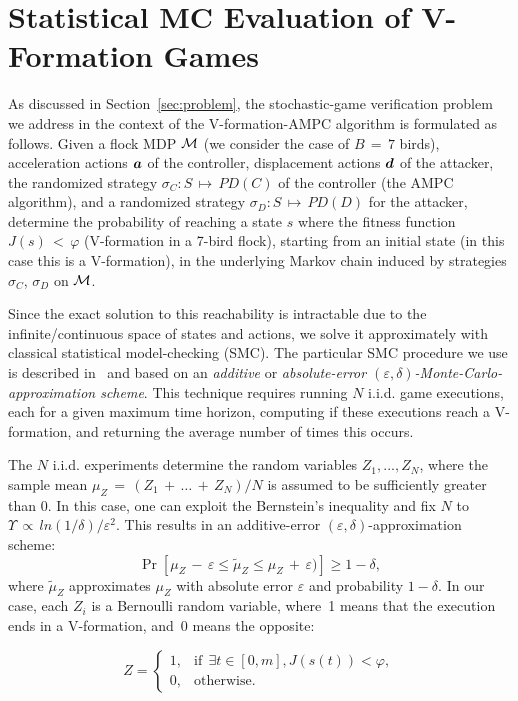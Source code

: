 \section{Statistical MC Evaluation of V-Formation Games}
\label{sec:results}
\newcommand{\majExp}{{2,000}}

As discussed in Section~\ref{sec:problem}, the
stochastic-game verification problem we address in the context of the V-formation-AMPC algorithm is formulated as follows.  Given a flock MDP ${\mathcal{M}}$ (we consider the case of $B\,{=}\,7$ birds), acceleration actions ${\boldsymbol {a}}$ of the controller, displacement actions ${\boldsymbol {d}}$ of the attacker, the randomized strategy $\sigma_C: S\,{\mapsto}\,PD(C)$ of the controller (the AMPC algorithm), and a randomized strategy
$\sigma_D: S\,{\mapsto}\,PD(D)$ for the attacker,
determine the probability of reaching a state $s$ where the fitness function $J(s)\,{<}\,\varphi$ (V-formation in a 7-bird flock), starting from an initial state (in this case this is a V-formation), in the underlying Markov chain induced by strategies $\sigma_C$, $\sigma_D$ on ${\mathcal{M}}$.

Since the exact solution to this reachability is intractable due to the infinite/continuous space of states and actions, we solve it approximately with classical statistical model-checking (SMC).  The particular SMC procedure we use is described in~\cite{grosu2014isola} and based on an {\em additive} or {\em absolute-error $(\varepsilon,\delta)$-Monte-Carlo-approximation scheme}. This technique requires running $N$ i.i.d. game executions, each for a given maximum time horizon, computing if these executions reach a V-formation, and returning the average number of times this occurs.

The $N$ i.i.d. experiments determine the random variables $Z_1, ...,Z_N$, where the sample mean $\mu_Z\,{=}\,(Z_1\,{+}\,{\ldots}\,{+}\,Z_N)/N$ is assumed to be sufficiently greater than 0. In this case, one can exploit the Bernstein's inequality and fix $N$ to $\Upsilon\,{\propto}\,ln(1/\delta)/\varepsilon^2$. This results in an additive-error $(\varepsilon,\delta)$-approximation scheme:
\[
\Pr\left[\mu_Z\,{-}\,\varepsilon\leqslant\widetilde{\mu}_Z\leqslant\mu_Z\,{+}\,\varepsilon)\right]\geqslant{}1-\delta,
\]
where $\widetilde{\mu}_Z$ approximates $\mu_Z$ with absolute error $\varepsilon$ and probability $1-\delta$. In our case, each $Z_i$ is a Bernoulli random variable, where~1 means that the execution ends in a V-formation, and~0 means the opposite:
 
 \[Z=\left\{
\begin{array}{ll}
1, & \text{if}\:\:\exists t \in [0, m], J(s(t)) < \varphi,\\
0, & \text{otherwise}.
\end{array}\right.\]

